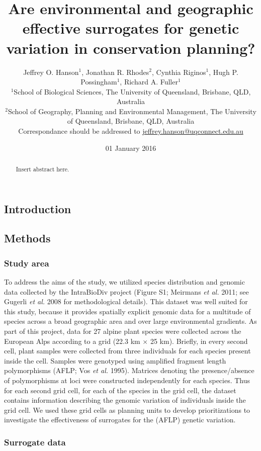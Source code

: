 \documentclass[11pt,]{article}
\title{Are environmental and geographic effective surrogates for genetic
variation in conservation planning?}
\author{Jeffrey O. Hanson$^1$, Jonathan R. Rhodes$^2$, Cynthia Riginos$^1$, Hugh
P. Possingham$^1$, Richard A. Fuller$^1$\\$^1$School of Biological
Sciences, The University of Queensland, Brisbane, QLD,
Australia\\$^2$School of Geography, Planning and Environmental
Management, The University of Queensland, Brisbane, QLD,
Australia\\Correspondance should be addressed to
\href{mailto:jeffrey.hanson@uqconnect.edu.au}{jeffrey.hanson@uqconnect.edu.au}}
\date{01 January 2016}
\begin{document}
\maketitle

\begin{abstract}
Insert abstract here.
\end{abstract}

\subsection{Introduction}\label{introduction}

\subsection{Methods}\label{methods}

\subsubsection{Study area}\label{study-area}

To address the aims of the study, we utilized species distribution and
genomic data collected by the IntraBioDiv project (Figure S1; Meirmans
\emph{et al.} 2011; see Gugerli \emph{et al.} 2008 for methodological
details). This dataset was well suited for this study, because it
provides spatially explicit genomic data for a multitude of species
across a broad geographic area and over large environmental gradients.
As part of this project, data for 27 alpine plant species were collected
across the European Alps according to a grid (22.3 km $\times$ 25 km).
Briefly, in every second cell, plant samples were collected from three
individuals for each species present inside the cell. Samples were
genotyped using amplified fragment length polymorphisms (AFLP; Vos
\emph{et al.} 1995). Matrices denoting the presence/absence of
polymorphisms at loci were constructed independently for each species.
Thus for each second grid cell, for each of the species in the grid
cell, the dataset contains information describing the genomic variation
of individuals inside the grid cell. We used these grid cells as
planning units to develop prioritizations to investigate the
effectiveness of surrogates for the (AFLP) genetic variation.

\subsubsection{Surrogate data}\label{surrogate-data}
\end{document}
